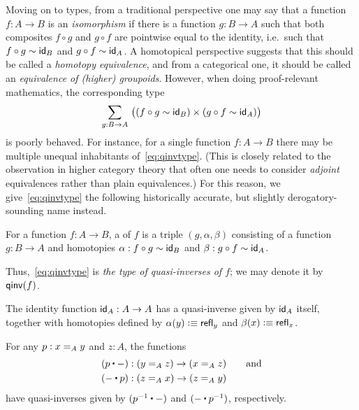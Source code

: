 %
Moving on to types, from a traditional perspective one may say that a function $f:A\to B$ is an \emph{isomorphism} if there is a function $g:B\to A$ such that both composites $f\circ g$ and $g\circ f$ are pointwise equal to the identity, i.e.\ such that $f \circ g \htpy \idfunc[B]$ and $g\circ f \htpy \idfunc[A]$.
A homotopical perspective suggests that this should be called a \emph{homotopy equivalence}, and from a categorical one, it should be called an \emph{equivalence of (higher) groupoids}.
However, when doing proof-relevant mathematics,
%
the corresponding type
\begin{equation}
  \sm{g:B\to A} \big((f \circ g \htpy \idfunc[B]) \times (g\circ f \htpy \idfunc[A])\big)\label{eq:qinvtype}
\end{equation}
is poorly behaved.
For instance, for a single function $f:A\to B$ there may be multiple unequal inhabitants of~\eqref{eq:qinvtype}.
(This is closely related to the observation in higher category theory that often one needs to consider \emph{adjoint} equivalences rather than plain equivalences.)
For this reason, we give~\eqref{eq:qinvtype} the following historically accurate, but slightly de\-rog\-a\-to\-ry-sounding name instead.

\begin{defn}
  For a function $f:A\to B$, a 
  of $f$ is a triple $(g,\alpha,\beta)$ consisting of a function $g:B\to A$ and homotopies
$\alpha:f\circ g\htpy \idfunc[B]$ and $\beta:g\circ f\htpy \idfunc[A]$.
\end{defn}

Thus,~\eqref{eq:qinvtype} is \emph{the type of quasi-inverses of $f$}; we may denote it by $\qinv(f)$.

\begin{eg}\label{eg:idequiv}
  The identity function $\idfunc[A]:A\to A$ has a quasi-inverse given by $\idfunc[A]$ itself, together with homotopies defined by $\alpha(y) \defeq \refl{y}$ and $\beta(x) \defeq \refl{x}$.
\end{eg}

\begin{eg}\label{eg:concatequiv}
  For any $p:\id[A]xy$ and $z:A$, the functions
  \begin{align*}
    (p\ct {-})&:(\id[A]yz) \to (\id[A]xz) \qquad\text{and}\\
    ({-} \ct p)&:(\id[A]zx) \to (\id[A]zy)
  \end{align*}
  have quasi-inverses given by $(\opp p \ct {-})$ and $({-} \ct \opp p)$, respectively.
\end{eg}

